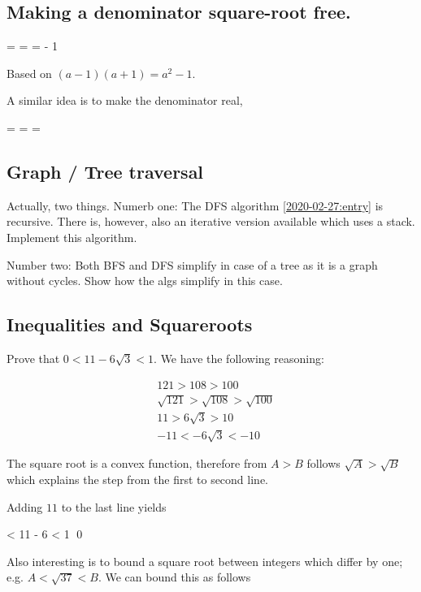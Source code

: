 
\subsection{Making a denominator square-root free.}

\bee
{} =  =  =  - 1
\eee

Based on $(a-1)(a+1) = a^2 - 1$.

A similar idea is to make the denominator real,

\bee
{} =  =  = 
\eee


\subsection{Graph / Tree traversal}

Actually, two things. Numerb one: The DFS algorithm \ref{2020-02-27:entry} is recursive. There is, however, also an iterative version available which uses a stack. Implement this algorithm.

Number two: Both BFS and DFS simplify in case of a tree as it is a graph without cycles. Show how the algs simplify in this case.


\subsection{Inequalities and Squareroots}

Prove that $0 < 11 - 6 \sqrt{3} < 1$. We have the following reasoning:

\begin{align*}
  &121 > 108 > 100 \\
  &\sqrt{121} > \sqrt{108} > \sqrt{100} \\
  &11 > 6 \sqrt{3} > 10 \\
  &-11 < -6 \sqrt{3}  < -10
\end{align*}

The square root is a convex function, therefore from $A > B$ follows $\sqrt{A} > \sqrt{B}$ which explains the step from the first to second line.

Adding $11$ to the last line yields

 < 11 - 6  < 1 \qed
\eee

Also interesting is to bound a square root between integers which differ by one; e.g. $A < \sqrt{37} < B$. We can bound this as follows

